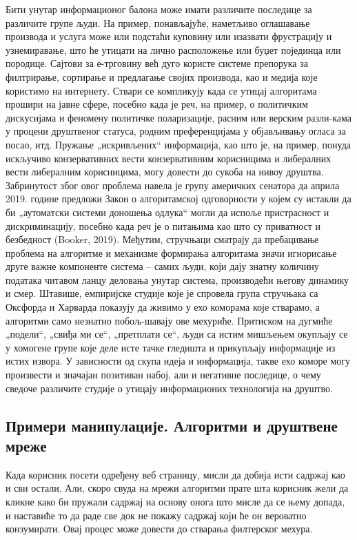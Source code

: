 \documentclass[a4paper]{article}
\begin{document}
Бити унутар информационог балона може имати различите последице за различите групе људи. На пример, понављајуће, наметљиво оглашавање производа и услуга може или подстаћи куповину или изазвати фрустрацију и узнемиравање, што ће утицати на лично расположење или буџет појединца или породице. Сајтови за е-трговину већ дуго користе системе препорука за филтрирање, сортирање и предлагање својих производа, као и медија које користимо на интернету. Ствари се компликују када се утицај алгоритама прошири на јавне сфере, посебно када је реч, на пример, о политичким дискусијама и феномену политичке поларизације, расним или верским разли-кама у процени друштвеног статуса, родним преференцијама у објављивању огласа за посао, итд. Пружање „искривљених“ информација, као што је, на пример, понуда искључиво конзервативних вести конзервативним корисницима и либералних вести либералним корисницима, могу довести до сукоба на нивоу друштва. Забринутост због овог проблема навела је групу америчких сенатора да априла 2019. године предложи Закон о алгоритамској одговорности у којем су истакли да би „аутоматски системи доношења одлука“ могли да испоље пристрасност и дискриминацију, посебно када реч је о питањима као што су приватност и безбедност (Booker, 2019). Међутим, стручњаци сматрају да пребацивање проблема на алгоритме и механизме формирања алгоритама значи игнорисање друге важне компоненте система – самих људи, који дају знатну количину података читавом ланцу деловања унутар система, производећи његову динамику и смер\cite{miller}. Штавише, емпиријске студије које је спровела група стручњака са Оксфорда и Харварда показују да живимо у ехо коморама које стварамо, а алгоритми само незнатно побољ-шавају ове мехуриће. Притиском на дугмиће „подели“, „свиђа ми се“, „претплати се“, људи са истим мишљењем окупљају се у хомогене групе које деле исте тачке гледишта и прикупљају информације из истих извора. У зависности од скупа идеја и информација, такве ехо коморе могу произвести и значајан позитиван набој, али и негативне последице, о чему сведоче различите студије о утицају информационих технологија на друштво.

\subsection{Примери манипулације. Алгоритми и друштвене мреже}
\label{subsec:podnaslov6}

Када корисник посети одређену веб страницу, мисли да добија исти садржај као и сви остали. Али, скоро свуда на мрежи алгоритми прате шта корисник жели да кликне како би пружали садржај на основу онога што мисле да се њему допада, и наставиће то да раде све док не покажу садржај који ће он вероватно конзумирати. Овај процес може довести до стварања филтерског мехура. 
\end{document}
